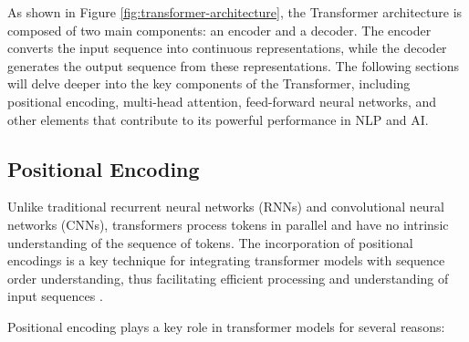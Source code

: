 As shown in Figure \ref{fig:transformer-architecture}, the Transformer architecture is composed of two main components: an encoder and a decoder. The encoder converts the input sequence into continuous representations, while the decoder generates the output sequence from these representations. The following sections will delve deeper into the key components of the Transformer, including positional encoding, multi-head attention, feed-forward neural networks, and other elements that contribute to its powerful performance in NLP and AI.

\subsection{Positional Encoding}

Unlike traditional recurrent neural networks (RNNs) and convolutional neural networks (CNNs), transformers process tokens in parallel and have no intrinsic understanding of the sequence of tokens. The incorporation of positional encodings is a key technique for integrating transformer models with sequence order understanding, thus facilitating efficient processing and understanding of input sequences \cite{li2023transformer}.

Positional encoding plays a key role in transformer models for several reasons:

